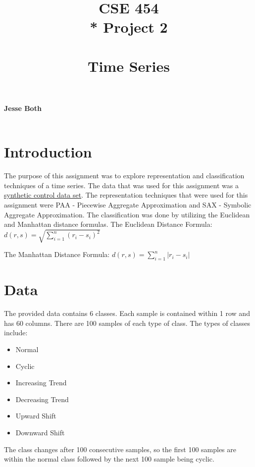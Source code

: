 \documentclass{article}
\title{\Huge{\textbf{CSE 454}  \\* Project 2 \\~\\ \textbf{Time Series}}}
\date{} %
\begin{document}
    \maketitle
    \vfill 
    {\Large\centering\textbf{Jesse Both  \\~\\}\par}

    {\Large{}\par}
    {\large\centering{\today}\par}

    \newpage
    \begin{center}
        \tableofcontents
    \end{center}
\newpage
\setcounter{secnumdepth}{-1}


\section{Introduction}
The purpose of this assignment was to explore representation and classification
techniques of a time series.  The data that was used for this assignment was
a \href{https://archive.ics.uci.edu/ml/datasets/Synthetic+Control+Chart+Time+Series}{synthetic control data set}.
The representation techniques that were used for this assignment were PAA - Piecewise
Aggregate Approximation and SAX - Symbolic Aggregate Approximation. The classification
was done by utilizing the Euclidean and Manhattan distance formulas.
\newline
\newline
\noindent
The Euclidean Distance Formula:
$d\left( r,s\right)   = \sqrt {\sum _{i=1}^{n}  \left( r_{i}-s_{i}\right)^2 } $

\noindent
The Manhattan Distance Formula:
$d\left( r,s\right)   = {\sum _{i=1}^{n}  \lvert r_{i}-s_{i}\rvert} $



\section{Data}
The provided data contains 6 classes.  Each sample is contained within 1
row and has 60 columns.  There are 100 samples of each type of class. 
The types of classes include:
\begin{itemize}
    \item Normal
    \item Cyclic
    \item Increasing Trend
    \item Decreasing Trend
    \item Upward Shift
    \item Downward Shift
  \end{itemize}
The class changes after 100 consecutive samples, so the first 100 samples 
are within the normal class followed by the next 100 sample being cyclic.
\end{document}
